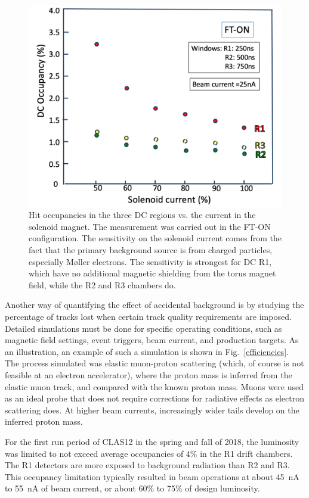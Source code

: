 \documentclass[final,3p,twocolumn]{elsarticle}
\begin{document}
\begin{figure}[t!]
\centerline{\includegraphics[width=1.0\columnwidth]{occupancy-solenoid.png}}
\caption{Hit occupancies in the three DC regions vs. the current in the solenoid magnet. The measurement was carried
  out in the FT-ON configuration. The sensitivity on the solenoid current comes from the fact that the primary
  background source is from charged particles, especially M{\o}ller electrons. The sensitivity is strongest for DC R1,
  which have no additional magnetic shielding from the torus magnet field, while the R2 and R3 chambers do.}
\label{occupancies2}
\end{figure}

Another way of quantifying the effect of accidental background is by studying the percentage of tracks lost when
certain track quality requirements are imposed. Detailed simulations must be done for specific operating conditions,
such as magnetic field settings, event triggers, beam current, and production targets. As an illustration, an example of
such a simulation is shown in Fig.~\ref{efficiencies}. The process simulated was elastic muon-proton scattering (which,
of course is not feasible at an electron accelerator), where the proton mass is inferred from the elastic muon track, and
compared with the known proton mass. Muons were used as an ideal probe that does not require corrections for radiative
effects as electron scattering does. At higher beam currents, increasingly wider tails develop on the inferred proton
mass. 

For the first run period of CLAS12 in the spring and fall of 2018, the luminosity was limited to not exceed average
occupancies of 4\% in the R1 drift chambers. The R1 detectors are more exposed to background radiation than R2 and
R3. This occupancy limitation typically resulted in beam operations at about 45~nA to 55~nA of beam current, or about
60\% to 75\% of design luminosity.
\end{document}
